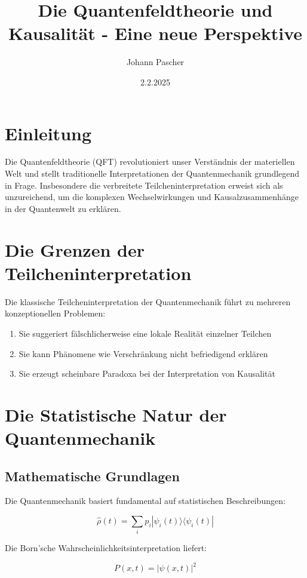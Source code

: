 \documentclass{article}
\title{Die Quantenfeldtheorie und Kausalität - Eine neue Perspektive}
\author{Johann Pascher}
\date{2.2.2025}
\begin{document}
	
	\maketitle
	\tableofcontents
	
	\section{Einleitung}
	Die Quantenfeldtheorie (QFT) revolutioniert unser Verständnis der materiellen Welt und stellt traditionelle Interpretationen der Quantenmechanik grundlegend in Frage. Insbesondere die verbreitete Teilcheninterpretation erweist sich als unzureichend, um die komplexen Wechselwirkungen und Kausalzusammenhänge in der Quantenwelt zu erklären.
	
	\section{Die Grenzen der Teilcheninterpretation}
	Die klassische Teilcheninterpretation der Quantenmechanik führt zu mehreren konzeptionellen Problemen:
	\begin{enumerate}
		\item Sie suggeriert fälschlicherweise eine lokale Realität einzelner Teilchen
		\item Sie kann Phänomene wie Verschränkung nicht befriedigend erklären
		\item Sie erzeugt scheinbare Paradoxa bei der Interpretation von Kausalität
	\end{enumerate}
	
	\section{Die Statistische Natur der Quantenmechanik}
	
	\subsection{Mathematische Grundlagen}
	Die Quantenmechanik basiert fundamental auf statistischen Beschreibungen:
	
	\begin{equation}
		\hat{\rho}(t) = \sum_i p_i |\psi_i(t)\rangle\langle\psi_i(t)|
	\end{equation}
	
	Die Born'sche Wahrscheinlichkeitsinterpretation \cite{born1926} liefert:
	
	\begin{equation}
		P(x,t) = |\psi(x,t)|^2
	\end{equation}
	
\end{document}

